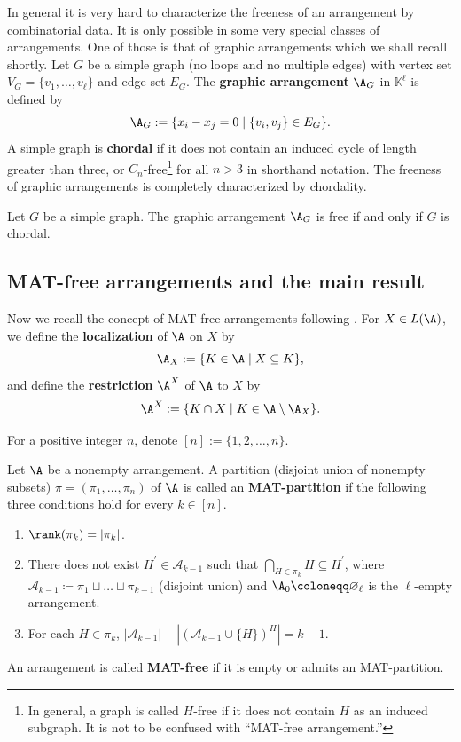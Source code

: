 In general it is very hard to characterize the freeness of an arrangement by combinatorial data. 
It is only possible in some very special classes of arrangements. 
One of those is that of graphic arrangements which we shall recall shortly. 
Let $G$ be a simple graph (\ie  no loops and no multiple edges) with vertex set $V_G = \{v_{1}, \dots, v_{\ell}\}$ and edge set $E_G$.
The  \textbf{graphic arrangement} $\A_G$ in $\mathbb{K}^\ell$ is defined by
$$\A_G:= \{x_i - x_j=0 \mid \{v_i,v_j\} \in E_G \}.$$
A simple graph is  \textbf{chordal} if it does not  contain an induced cycle of length greater than three, or $C_{n}$-free\footnote{In general, a graph is called $H$-free if it does not contain $H$ as an induced subgraph. It is not to be confused with ``MAT-free arrangement.''} for all $n >3$ in shorthand notation.
The freeness of graphic arrangements is completely characterized by chordality.
\begin{theorem}
\label{thm:free-chordal}
Let $G$ be a simple graph. 
The graphic arrangement $\A_G$ is free if and only if $G$ is chordal.
\end{theorem}

\subsection{MAT-free arrangements and the main result}
\label{subsec:MATfree-arr}
 
Now we recall the concept of MAT-free arrangements following \cite{CM20}.
For $X \in L(\A)$, we define the \textbf{localization} of $\A$ on $X$  by 
$${\A}_X := \{ K \in {\A} \mid X \subseteq K\},$$
and define the \textbf{restriction} ${\A}^{X}$ of ${\A}$ to $X$ by 
$${\A}^{X}:= \{ K \cap X \mid K \in{\A }\setminus {\A}_X\}.$$

For a positive integer $n$, denote $[n]:=\{1,2,\ldots,n\}$. 
\begin{definition}
\label{def:MAT-partition-free}
Let $\A$ be a nonempty arrangement. 
A partition (disjoint union of nonempty subsets) $\pi= (\pi_{1}, \dots, \pi_{n}) $ of $\A$ is called an \textbf{MAT-partition} if  the following three conditions hold for every $ k \in [n] $. 
\begin{enumerate}[label=(MP\arabic*)]
\item\label{definition MAT partition 1} $ \rank(\pi_{k}) = |\pi_{k}| $.
\item\label{definition MAT partition 2} There does not exist $ H^{\prime} \in \mathcal{A}_{k-1} $ such that $ \bigcap_{H \in \pi_{k}}H \subseteq H^{\prime} $, where $ \mathcal{A}_{k-1} \coloneqq \pi_{1} \sqcup \dots \sqcup \pi_{k-1} $ (disjoint union) and $ \A_{0} \coloneqq \varnothing_\ell $ is the $\ell$-empty arrangement. 
\item\label{definition MAT partition 3} For each $ H \in \pi_{k} $, $ |\mathcal{A}_{k-1}| - |(\mathcal{A}_{k-1} \cup \{H\})^{H}| = k-1 $. 
\end{enumerate}
An arrangement  is called \textbf{MAT-free} if it is empty or  admits an MAT-partition. 
\end{definition}

